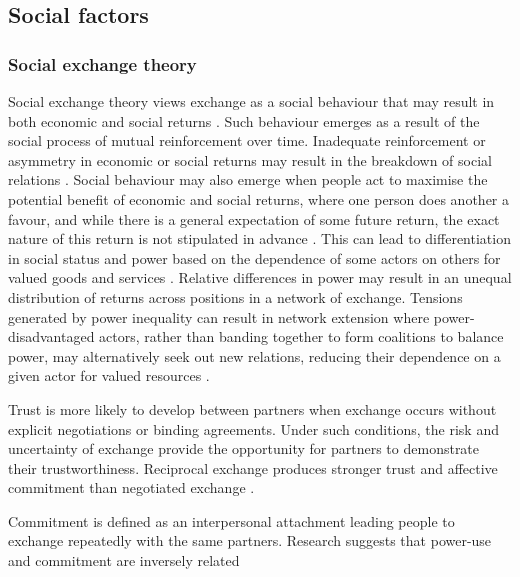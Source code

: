 


\subsection{Social factors}

\subsubsection{Social exchange theory}

Social exchange theory views exchange as a social behaviour that may result in both economic and social returns \citep{lambe2001social}. Such behaviour emerges as a result of the social process of mutual reinforcement over time. Inadequate reinforcement or asymmetry in economic or social returns may result in the breakdown of social relations \citep{homans1961social}. Social behaviour may also emerge when people act to maximise the potential benefit of economic and social returns, where one person does another a favour, and while there is a general expectation of some future return, the exact nature of this return is not stipulated in advance \citep{blau1986exchange}. This can lead to differentiation in social status and power based on the dependence of some actors on others for valued goods and services \citep{emerson1962power}. Relative differences in power may result in an unequal distribution of returns across positions in a network of exchange. Tensions generated by power inequality can result in network extension where power-disadvantaged actors, rather than banding together to form coalitions to balance power, may alternatively seek out new relations, reducing their dependence on a given actor for valued resources \citep{cook2013social}. 

Trust is more likely to develop between partners when exchange occurs without explicit negotiations or binding agreements. Under such conditions, the risk and uncertainty of exchange provide the opportunity for partners to demonstrate their trustworthiness. Reciprocal exchange produces stronger trust and affective commitment than negotiated exchange \citep{molm2000risk}. 

Commitment is defined as an interpersonal attachment leading people to exchange repeatedly with the same partners. Research suggests that power-use and commitment are inversely related \citep{cook1978power}


